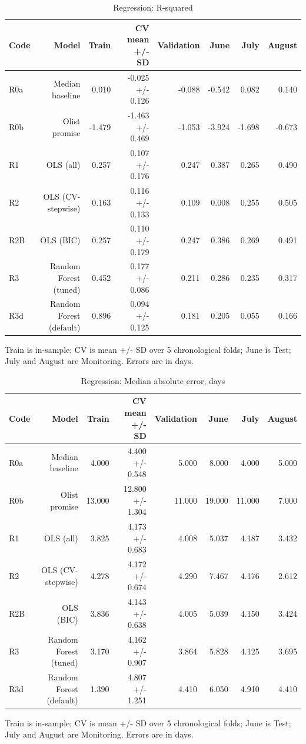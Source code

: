 \begin{table}[htbp]
\centering
\small
\caption{Regression: R-squared}
\begin{tabular}{lrrrrrrr}
\toprule
Code & Model & Train & CV mean +/- SD & Validation & June & July & August \\
\midrule
R0a & Median baseline & 0.010 & -0.025 +/- 0.126 & -0.088 & -0.542 & 0.082 & 0.140 \\
R0b & Olist promise & -1.479 & -1.463 +/- 0.469 & -1.053 & -3.924 & -1.698 & -0.673 \\
R1 & OLS (all) & 0.257 & 0.107 +/- 0.176 & 0.247 & 0.387 & 0.265 & 0.490 \\
R2 & OLS (CV-stepwise) & 0.163 & 0.116 +/- 0.133 & 0.109 & 0.008 & 0.255 & 0.505 \\
R2B & OLS (BIC) & 0.257 & 0.110 +/- 0.179 & 0.247 & 0.386 & 0.269 & 0.491 \\
R3 & Random Forest (tuned) & 0.452 & 0.177 +/- 0.086 & 0.211 & 0.286 & 0.235 & 0.317 \\
R3d & Random Forest (default) & 0.896 & 0.094 +/- 0.125 & 0.181 & 0.205 & 0.055 & 0.166 \\
\bottomrule
\end{tabular}
\par\smallskip\begin{minipage}{\linewidth}\footnotesize Train is in-sample; CV is mean +/- SD over 5 chronological folds; June is Test; July and August are Monitoring. Errors are in days.\end{minipage}
\end{table}


\begin{table}[htbp]
\centering
\small
\caption{Regression: Median absolute error, days}
\begin{tabular}{lrrrrrrr}
\toprule
Code & Model & Train & CV mean +/- SD & Validation & June & July & August \\
\midrule
R0a & Median baseline & 4.000 & 4.400 +/- 0.548 & 5.000 & 8.000 & 4.000 & 5.000 \\
R0b & Olist promise & 13.000 & 12.800 +/- 1.304 & 11.000 & 19.000 & 11.000 & 7.000 \\
R1 & OLS (all) & 3.825 & 4.173 +/- 0.683 & 4.008 & 5.037 & 4.187 & 3.432 \\
R2 & OLS (CV-stepwise) & 4.278 & 4.172 +/- 0.674 & 4.290 & 7.467 & 4.176 & 2.612 \\
R2B & OLS (BIC) & 3.836 & 4.143 +/- 0.638 & 4.005 & 5.039 & 4.150 & 3.424 \\
R3 & Random Forest (tuned) & 3.170 & 4.162 +/- 0.907 & 3.864 & 5.828 & 4.125 & 3.695 \\
R3d & Random Forest (default) & 1.390 & 4.807 +/- 1.251 & 4.410 & 6.050 & 4.910 & 4.410 \\
\bottomrule
\end{tabular}
\par\smallskip\begin{minipage}{\linewidth}\footnotesize Train is in-sample; CV is mean +/- SD over 5 chronological folds; June is Test; July and August are Monitoring. Errors are in days.\end{minipage}
\end{table}


